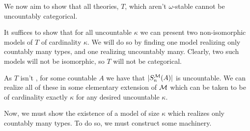 We now aim to show that all theories, \(T\), which aren't \(\omega\)-stable cannot be uncountably categorical.

It suffices to show that for all uncountable \(\kappa\) we can present two non-isomorphic models of \(T\) of cardinality \(\kappa\). We will do so by finding one model realizing only countably many types, and one realizing uncountably many. Clearly, two such models will not be isomorphic, so \(T\) will not be categorical. 


As \(T\) isn't \omst, for some countable \(A\) we have that \(|S_n^{\mathcal{M}}(A)|\) is uncountable. We can realize all of these in some elementary extension of \(\mathcal{M}\) which can be taken to be of cardinality exactly \(\kappa\) for any desired uncountable \(\kappa\). 


Now, we must show the existence of a model of size \(\kappa\) which realizes only countably many types. To do so, we must construct some machinery. 
